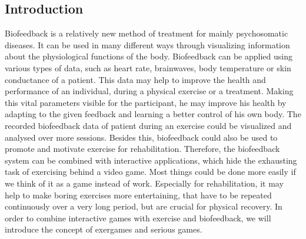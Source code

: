 \begin{multicols}{2}

\section{Introduction}
Biofeedback is a relatively new method of treatment for mainly psychosomatic diseases. It can be used in many different ways through visualizing information about the physiological functions of the body. Biofeedback can be applied using various types of data, such as heart rate, brainwaves, body temperature or skin conductance of a patient. This data may help to improve the health and performance of an individual, during a physical exercise or a treatment. Making this vital parameters visible for the participant, he may improve his health by adapting to the given feedback and learning a better control of his own body.\cite{BF2007} The recorded biofeedback data of patient during an exercise could be visualized and analysed over more sessions. Besides this, biofeedback could also be used to promote and motivate exercise for rehabilitation. Therefore, the biofeedback system can be combined with interactive applications, which hide the exhausting task of exercising behind a video game. Most things could be done more easily if we think of it as a game instead of work. Especially for rehabilitation, it may help to make boring exercises more entertaining, that have to be repeated continuously over a very long
period, but are crucial for physical recovery. In order to combine interactive games with
exercise and biofeedback, we will introduce the concept of exergames and serious games.

\end{multicols}
